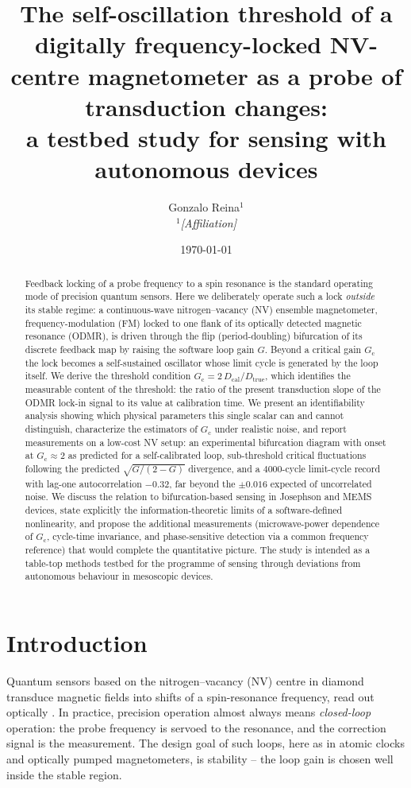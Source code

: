 \documentclass[11pt,a4paper]{article}
\title{The self-oscillation threshold of a digitally frequency-locked
NV-centre magnetometer as a probe of transduction changes:\\
a testbed study for sensing with autonomous devices}
\author{Gonzalo Reina$^{1}$\\[2pt]
\small $^{1}$\textit{[Affiliation]}}
\date{\today}
\newcommand{\Gc}{G_{\mathrm{c}}}
\newcommand{\Dcal}{D_{\mathrm{cal}}}
\newcommand{\Dtrue}{D_{\mathrm{true}}}
\begin{document}
\maketitle

\begin{abstract}
Feedback locking of a probe frequency to a spin resonance is the standard
operating mode of precision quantum sensors. Here we deliberately operate such a
lock \emph{outside} its stable regime: a continuous-wave nitrogen--vacancy (NV)
ensemble magnetometer, frequency-modulation (FM) locked to one flank of its
optically detected magnetic resonance (ODMR), is driven through the flip
(period-doubling) bifurcation of its discrete feedback map by raising the
software loop gain $G$. Beyond a critical gain $\Gc$ the lock becomes a
self-sustained oscillator whose limit cycle is generated by the loop itself. We
derive the threshold condition $\Gc = 2\,\Dcal/\Dtrue$, which identifies the
measurable content of the threshold: the ratio of the present transduction
slope of the ODMR lock-in signal to its value at calibration time. We present
an identifiability analysis showing which physical parameters this single
scalar can and cannot distinguish, characterize the estimators of $\Gc$ under
realistic noise, and report measurements on a low-cost NV setup: an
experimental bifurcation diagram with onset at $\Gc \approx 2$ as predicted for
a self-calibrated loop, sub-threshold critical fluctuations following the
predicted $\sqrt{G/(2-G)}$ divergence, and a $4000$-cycle limit-cycle record
with lag-one autocorrelation $-0.32$, far beyond the $\pm 0.016$ expected of
uncorrelated noise. We discuss the relation to bifurcation-based sensing in
Josephson and MEMS devices, state explicitly the information-theoretic limits
of a software-defined nonlinearity, and propose the additional measurements
(microwave-power dependence of $\Gc$, cycle-time invariance, and
phase-sensitive detection via a common frequency reference) that would
complete the quantitative picture. The study is intended as a table-top
methods testbed for the programme of sensing through deviations from
autonomous behaviour in mesoscopic devices.
\end{abstract}

\section{Introduction}
\label{sec:intro}

Quantum sensors based on the nitrogen--vacancy (NV) centre in diamond
transduce magnetic fields into shifts of a spin-resonance frequency, read out
optically \cite{Degen2017,Barry2020}. In practice, precision operation almost
always means \emph{closed-loop} operation: the probe frequency is servoed to
the resonance, and the correction signal is the measurement. The design goal
of such loops, here as in atomic clocks and optically pumped magnetometers, is
stability -- the loop gain is chosen well inside the stable region.
\end{document}
